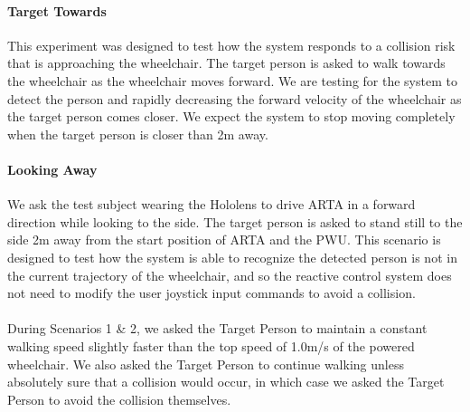 \paragraph{Target Towards} This experiment was designed to test how the system responds to a collision risk that is approaching the wheelchair. The target person is asked to walk towards the wheelchair as the wheelchair moves forward. We are testing for the system to detect the person and rapidly decreasing the forward velocity of the wheelchair as the target person comes closer. We expect the system to stop moving completely when the target person is closer than 2m away.

\paragraph{Looking Away} We ask the test subject wearing the Hololens to drive ARTA in a forward direction while looking to the side. The target person is asked to stand still to the side 2m away from the start position of ARTA and the PWU. This scenario is designed to test how the system is able to recognize the detected person is not in the current trajectory of the wheelchair, and so the reactive control system does not need to modify the user joystick input commands to avoid a collision.

\paragraph{} During Scenarios 1 \& 2, we asked the Target Person to maintain a constant walking speed slightly faster than the top speed of 1.0m/s of the powered wheelchair. We also asked the Target Person to continue walking unless absolutely sure that a collision would occur, in which case we asked the Target Person to avoid the collision themselves.

